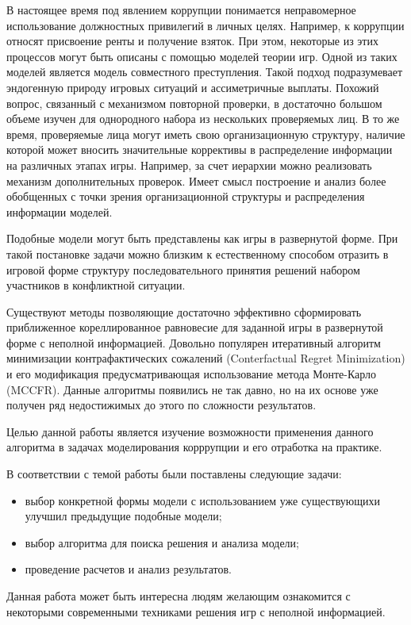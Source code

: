 \Introduction

\par
В настоящее время под явлением коррупции понимается неправомерное использование должностных привилегий в личных целях. Например, к коррупции относят присвоение ренты и получение взяток. При этом, некоторые из этих процессов могут быть описаны с помощью моделей теории игр. Одной из таких моделей является модель совместного преступления\cite{Spengler}. Такой подход подразумевает эндогенную природу игровых ситуаций и ассиметричные выплаты. Похожий вопрос, связанный с механизмом повторной проверки, в достаточно большом объеме изучен для однородного набора из нескольких проверяемых лиц\cite{Kumacheva}. В то же время, проверяемые лица могут иметь свою организационную структуру, наличие которой может вносить значительные коррективы в распределение информации на различных этапах игры. Например, за счет иерархии можно реализовать механизм дополнительных проверок\cite{Orlov}. Имеет смысл построение и анализ более обобщенных с точки зрения организационной структуры и распределения информации моделей.
\par
Подобные модели могут быть представлены как игры в развернутой форме. При такой постановке задачи можно близким к естественному способом отразить в игровой форме структуру последовательного принятия решений набором участников в конфликтной ситуации.
\par
Существуют методы позволяющие достаточно эффективно сформировать приближенное кореллированное равновесие для заданной игры в развернутой форме с неполной информацией. Довольно популярен итеративный алгоритм минимизации контрафактических сожалений (Conterfactual Regret Minimization)\cite{NIPS07cfr} и его модификация предусматривающая использование метода Монте-Карло (MCCFR)\cite{MCCFR}.  Данные алгоритмы появились не так давно, но на их основе уже получен ряд недостижимых до этого по сложности результатов.
\par
Целью данной работы является изучение возможности применения данного алгоритма в задачах моделирования корррупции и его отработка на практике.
\par
В соответствии с темой работы были поставлены следующие задачи:
\begin{itemize}
	\item выбор конкретной формы модели с использованием уже существующихи улучшил предыдущие подобные модели;
	\item выбор алгоритма для поиска решения и анализа модели;
	\item проведение расчетов и анализ результатов.
\end{itemize}
\par
Данная работа может быть интересна людям желающим ознакомится с некоторыми современными техниками решения игр с неполной информацией.
